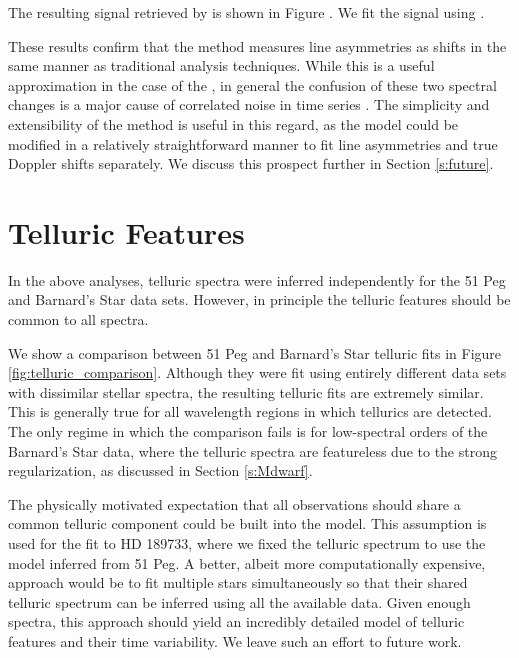 \documentclass[modern]{aastex62}
\newcommand{\Mdwarf}{Barnard's Star\xspace} %
\begin{document}

The resulting \RV signal retrieved by \wobble is shown in Figure . 
We fit the signal using \starry \citep{Luger2018}.  

These results confirm that the \wobble method measures line asymmetries as \RV shifts in the same manner as traditional \RV analysis techniques. 
While this is a useful approximation in the case of the \RM, in general the confusion of these two spectral changes is a major cause of correlated noise in \RV time series \citep[e.g.][]{}. 
The simplicity and extensibility of the \wobble method is useful in this regard, as the model could be modified in a relatively straightforward manner to fit line asymmetries and true Doppler shifts separately. 
We discuss this prospect further in Section \ref{s:future}.

\section{Telluric Features}

In the above analyses, telluric spectra were inferred independently for the 51 Peg and \Mdwarf data sets. 
However, in principle the telluric features should be common to all \HARPS spectra. 

We show a comparison between 51 Peg and \Mdwarf telluric fits in Figure \ref{fig:telluric_comparison}. 
Although they were fit using entirely different data sets with dissimilar stellar spectra, the resulting telluric fits are extremely similar. 
This is generally true for all wavelength regions in which tellurics are detected. 
The only regime in which the comparison fails is for low-\SNR spectral orders of the \Mdwarf data, where the telluric spectra are featureless due to the strong regularization, as discussed in Section \ref{s:Mdwarf}. 

The physically motivated expectation that all observations should share a common telluric component could be built into the \wobble model. 
This assumption is used for the fit to HD 189733, where we fixed the telluric spectrum to use the model inferred from 51 Peg. 
A better, albeit more computationally expensive, approach would be to fit multiple stars simultaneously so that their shared telluric spectrum can be inferred using all the available data. 
Given enough spectra, this approach should yield an incredibly detailed model of telluric features and their time variability. 
We leave such an effort to future work. 
\end{document}
